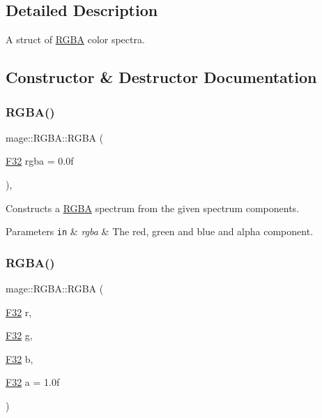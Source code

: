 \subsection{Detailed Description}
A struct of \hyperlink{structmage_1_1_r_g_b_a}{R\+G\+BA} color spectra. 

\subsection{Constructor \& Destructor Documentation}
\hypertarget{structmage_1_1_r_g_b_a_a964d2235221668b6284b07dcc296c9f9}{}\label{structmage_1_1_r_g_b_a_a964d2235221668b6284b07dcc296c9f9} 
\subsubsection{\texorpdfstring{R\+G\+B\+A()}{RGBA()}\hspace{0.1cm}{\footnotesize\ttfamily [1/9]}}
{\footnotesize\ttfamily mage\+::\+R\+G\+B\+A\+::\+R\+G\+BA (\begin{DoxyParamCaption}\item[{\hyperlink{namespacemage_aa97e833b45f06d60a0a9c4fc22ae02c0}{F32}}]{rgba = {\ttfamily 0.0f} }\end{DoxyParamCaption})\hspace{0.3cm}{\ttfamily [explicit]}, {\ttfamily [noexcept]}}

Constructs a \hyperlink{structmage_1_1_r_g_b_a}{R\+G\+BA} spectrum from the given spectrum components.


\begin{DoxyParams}[1]{Parameters}
\mbox{\tt in}  & {\em rgba} & The red, green and blue and alpha component. \\
\hline
\end{DoxyParams}
\hypertarget{structmage_1_1_r_g_b_a_a9665c78c3ba560a9fd40e82ce0fe1fdb}{}\label{structmage_1_1_r_g_b_a_a9665c78c3ba560a9fd40e82ce0fe1fdb} 
\subsubsection{\texorpdfstring{R\+G\+B\+A()}{RGBA()}\hspace{0.1cm}{\footnotesize\ttfamily [2/9]}}
{\footnotesize\ttfamily mage\+::\+R\+G\+B\+A\+::\+R\+G\+BA (\begin{DoxyParamCaption}\item[{\hyperlink{namespacemage_aa97e833b45f06d60a0a9c4fc22ae02c0}{F32}}]{r,  }\item[{\hyperlink{namespacemage_aa97e833b45f06d60a0a9c4fc22ae02c0}{F32}}]{g,  }\item[{\hyperlink{namespacemage_aa97e833b45f06d60a0a9c4fc22ae02c0}{F32}}]{b,  }\item[{\hyperlink{namespacemage_aa97e833b45f06d60a0a9c4fc22ae02c0}{F32}}]{a = {\ttfamily 1.0f} }\end{DoxyParamCaption})\hspace{0.3cm}{\ttfamily [noexcept]}}

